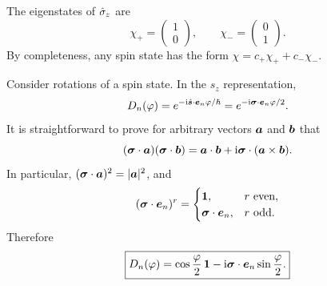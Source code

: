 The eigenstates of $\hat{\sigma}_z$ are
\begin{equation}
\chi_+=\begin{pmatrix}1\\0\end{pmatrix},\qquad
\chi_-=\begin{pmatrix}0\\1\end{pmatrix}.
\end{equation}
By completeness, any spin state has the form $\chi=c_+\chi_++c_-\chi_-$.

Consider rotations of a spin state. In the $s_z$ representation,
\begin{equation}
D_n(\varphi)=e^{-\mathrm{i}\hat{\bm{s}}\cdot\bm{e}_n\varphi/\hbar}
=e^{-\mathrm{i}\bm{\sigma}\cdot\bm{e}_n\varphi/2}.
\end{equation}
It is straightforward to prove for arbitrary vectors $\bm{a}$ and $\bm{b}$ that
\begin{equation}
(\bm{\sigma}\cdot\bm{a})(\bm{\sigma}\cdot\bm{b})
=\bm{a}\cdot\bm{b}+\mathrm{i}\bm{\sigma}\cdot(\bm{a}\times\bm{b}).
\end{equation}
In particular, $(\bm{\sigma}\cdot\bm{a})^2=|\bm{a}|^2$, and
\begin{equation}
(\bm{\sigma}\cdot\bm{e}_n)^r=
\begin{cases}\mathbf1,&r\text{ even},\\\bm{\sigma}\cdot\bm{e}_n,&r\text{ odd}.
\end{cases}
\end{equation}
Therefore
\begin{equation}
\boxed{D_n(\varphi)=\cos\frac\varphi2\,\mathbf1-\mathrm{i}\bm{\sigma}\cdot\bm{e}_n\sin\frac\varphi2.}
\end{equation}

